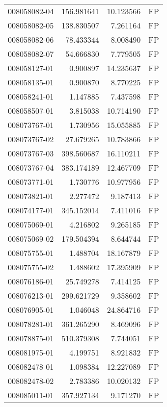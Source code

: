 \begin{tabular}{lrrl}
008058082-04 &  156.981641 &      10.123566 &   FP \\
008058082-05 &  138.830507 &       7.261164 &   FP \\
008058082-06 &   78.433344 &       8.008490 &   FP \\
008058082-07 &   54.666830 &       7.779505 &   FP \\
008058127-01 &    0.900897 &      14.235637 &   FP \\
008058135-01 &    0.900870 &       8.770225 &   FP \\
008058241-01 &    1.147885 &       7.437598 &   FP \\
008058507-01 &    3.815038 &      10.714190 &   FP \\
008073767-01 &    1.730956 &      15.055885 &   FP \\
008073767-02 &   27.679265 &      10.783866 &   FP \\
008073767-03 &  398.560687 &      16.110211 &   FP \\
008073767-04 &  383.174189 &      12.467709 &   FP \\
008073771-01 &    1.730776 &      10.977956 &   FP \\
008073821-01 &    2.277472 &       9.187413 &   FP \\
008074177-01 &  345.152014 &       7.411016 &   FP \\
008075069-01 &    4.216802 &       9.265185 &   FP \\
008075069-02 &  179.504394 &       8.644744 &   FP \\
008075755-01 &    1.488704 &      18.167879 &   FP \\
008075755-02 &    1.488602 &      17.395909 &   FP \\
008076186-01 &   25.749278 &       7.414125 &   FP \\
008076213-01 &  299.621729 &       9.358602 &   FP \\
008076905-01 &    1.046048 &      24.864716 &   FP \\
008078281-01 &  361.265290 &       8.469096 &   FP \\
008078875-01 &  510.379308 &       7.744051 &   FP \\
008081975-01 &    4.199751 &       8.921832 &   FP \\
008082478-01 &    1.098384 &      12.227089 &   FP \\
008082478-02 &    2.783386 &      10.020132 &   FP \\
008085011-01 &  357.927134 &       9.171270 &   FP \\

\end{tabular}
